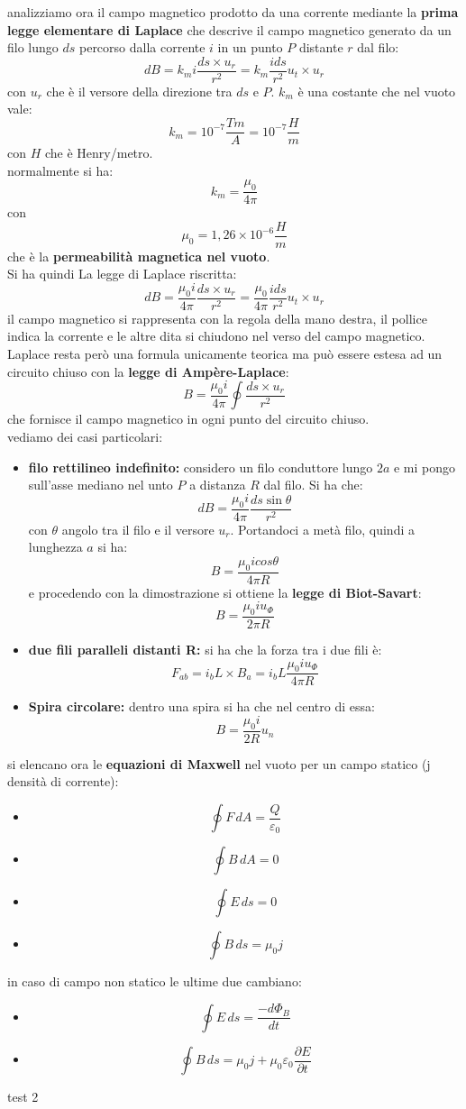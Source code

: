 \documentclass[a4paper,12pt, oneside]{book}
\begin{document}
analizziamo ora il campo magnetico prodotto da una corrente mediante la \textbf{prima legge elementare di Laplace} che descrive il campo magnetico generato da un filo lungo $ds$ percorso dalla corrente $i$ in un punto $P$ distante $r$ dal filo:
$$dB=k_mi\frac{ds\times u_r}{r^2}=k_m\frac{ids}{r^2}u_t\times u_r$$
con $u_r$ che è il versore della direzione tra $ds$ e $P$. $k_m$ è una costante che nel vuoto vale:
$$k_m=10^{-7}\frac{Tm}{A}=10^{-7}\frac{H}{m}$$
con $H$ che è Henry/metro.\\
normalmente si ha:
$$k_m=\frac{\mu_0}{4\pi}$$
con
$$\mu_0=1,26\times 10^{-6}\frac{H}{m}$$
che è la \textbf{permeabilità magnetica nel vuoto}.\\
Si ha quindi La legge di Laplace riscritta:
$$dB=\frac{\mu_0i}{4\pi}\frac{ds\times u_r}{r^2}=\frac{\mu_0}{4\pi}\frac{ids}{r^2}u_t\times u_r$$
il campo magnetico si rappresenta con la regola della mano destra, il pollice indica la corrente e le altre dita si chiudono nel verso del campo magnetico.\\ Laplace resta però una formula unicamente teorica ma può essere estesa ad un circuito chiuso con la \textbf{legge di Ampère-Laplace}:
$$B=\frac{\mu_0i}{4\pi}\oint\frac{ds\times u_r}{r^2}$$
che fornisce il campo magnetico in ogni punto del circuito chiuso.\\
vediamo dei casi particolari:
\begin{itemize}
	\item \textbf{filo rettilineo indefinito:} considero un filo conduttore lungo $2a$ e mi pongo sull'asse mediano nel unto $P$ a distanza $R$ dal filo. Si ha che:
	      $$dB=\frac{\mu_0i}{4\pi}\frac{ds\sin\theta}{r^2}$$
	      con $\theta$ angolo tra il filo e il versore $u_r$. Portandoci a metà filo, quindi a lunghezza $a$ si ha:
	      $$B=\frac{\mu_0icos\theta}{4\pi R}$$
	      e procedendo con la dimostrazione si ottiene la \textbf{legge di Biot-Savart}:
	      $$B=\frac{\mu_0 iu_\Phi}{2\pi R}$$
	\item \textbf{due fili paralleli distanti R:} si ha che la forza tra i due fili è:
	      $$F_{ab}=i_bL\times B_a=i_bL\frac{\mu_0iu_\Phi}{4\pi R}$$
	\item \textbf{Spira circolare:} dentro una spira si ha che nel centro di essa:
	      $$B=\frac{\mu_0i}{2 R}u_n$$
\end{itemize}
si elencano ora le \textbf{equazioni di Maxwell} nel vuoto per un campo statico (j densità di corrente):
\begin{itemize}
	\item $$\oint F\,dA=\frac{Q}{\varepsilon_0}$$
	\item  $$\oint B\,dA=0$$
	\item  $$\oint E\,ds=0$$
	\item  $$\oint B\,ds=\mu_0 j$$
\end{itemize}
in caso di campo non statico le ultime due cambiano:
\begin{itemize}
	\item  $$\oint E\,ds=\frac{-d\Phi_B}{dt}$$
	\item  $$\oint B\,ds=\mu_0 j+\mu_0\varepsilon_0\frac{\partial E}{\partial t}$$
\end{itemize}
test 2
\end{document}
